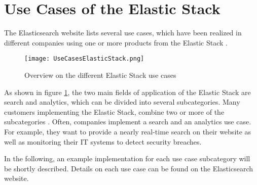 \section{Use Cases of the Elastic Stack}
The Elasticsearch website lists several use cases, which have been realized in different companies using one or more products from the Elastic Stack \autocite{elastic2019_02}. 

\begin{figure}[H]
    \centering
    \texttt{[image: UseCasesElasticStack.png]}
    \caption{Overview on the different Elastic Stack use cases}
    \label{fig:estackusecases}
\end{figure}

As shown in figure \ref{fig:estackusecases}, the two main fields of application of the Elastic Stack are search and analytics, which can be divided into several subcategories. Many customers implementing the Elastic Stack, combine two or more of the subcategories \autocite{elastic2019_02}. Often, companies implement a search and an analytics use case. For example, they want to provide a nearly real-time search on their website as well as monitoring their IT systems to detect security breaches. 

In the following, an example implementation for each use case subcategory will be shortly described. Details on each use case can be found on the Elasticsearch website.

